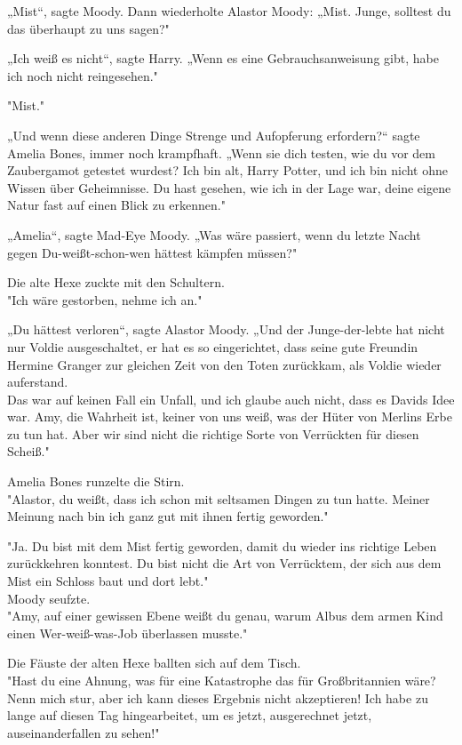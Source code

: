 {„Mist“, sagte Moody. Dann wiederholte Alastor Moody: „Mist. Junge, solltest du das überhaupt zu uns sagen?"

„Ich weiß es nicht“, sagte Harry. „Wenn es eine Gebrauchsanweisung gibt, habe ich noch nicht reingesehen."

"Mist."

„Und wenn diese anderen Dinge Strenge und Aufopferung erfordern?“ sagte Amelia Bones, immer noch krampfhaft. „Wenn sie dich testen, wie du vor dem Zaubergamot getestet wurdest? Ich bin alt, Harry Potter, und ich bin nicht ohne Wissen über Geheimnisse. Du hast gesehen, wie ich in der Lage war, deine eigene Natur fast auf einen Blick zu erkennen."

„Amelia“, sagte Mad-Eye Moody. „Was wäre passiert, wenn du letzte Nacht gegen Du-weißt-schon-wen hättest kämpfen müssen?"

Die alte Hexe zuckte mit den Schultern.\\ "Ich wäre gestorben, nehme ich an."

„Du hättest verloren“, sagte Alastor Moody. „Und der Junge-der-lebte hat nicht nur Voldie ausgeschaltet, er hat es so eingerichtet, dass seine gute Freundin Hermine Granger zur gleichen Zeit von den Toten zurückkam, als Voldie wieder auferstand.\\ Das war auf keinen Fall ein Unfall, und ich glaube auch nicht, dass es Davids Idee war. Amy, die Wahrheit ist, keiner von uns weiß, was der Hüter von Merlins Erbe zu tun hat. Aber wir sind nicht die richtige Sorte von Verrückten für diesen Scheiß."

Amelia Bones runzelte die Stirn.\\ "Alastor, du weißt, dass ich schon mit seltsamen Dingen zu tun hatte. Meiner Meinung nach bin ich ganz gut mit ihnen fertig geworden."

"Ja. Du bist mit dem Mist fertig geworden, damit du wieder ins richtige Leben zurückkehren konntest. Du bist nicht die Art von Verrücktem, der sich aus dem Mist ein Schloss baut und dort lebt."\\ Moody seufzte.\\ "Amy, auf einer gewissen Ebene weißt du genau, warum Albus dem armen Kind einen Wer-weiß-was-Job überlassen musste."

Die Fäuste der alten Hexe ballten sich auf dem Tisch.\\ "Hast du eine Ahnung, was für eine Katastrophe das für Großbritannien wäre? Nenn mich stur, aber ich kann dieses Ergebnis nicht akzeptieren! Ich habe zu lange auf diesen Tag hingearbeitet, um es jetzt, ausgerechnet jetzt, auseinanderfallen zu sehen!"

}
